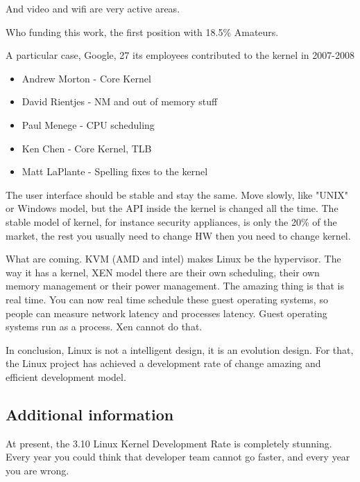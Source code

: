 \documentclass[11pt]{article}
\begin{document}
And video and wifi are very active areas.

Who funding this work, the first position with 18.5\% Amateurs.

A particular case, Google, 27 its employees contributed to the kernel in 2007-2008
\begin{itemize}
	\item Andrew Morton - Core Kernel
	\item David Rientjes - NM and out of memory stuff
	\item Paul Menege - CPU scheduling
	\item Ken Chen - Core Kernel, TLB
	\item Matt LaPlante - Spelling fixes to the kernel
\end{itemize}

The user interface should be stable and stay the same. Move slowly, like "UNIX" or Windows model, but the API inside the kernel is changed all the time. The stable model of kernel, for instance security appliances, is only the 20\% of the market, the rest you usually need to change HW then you need to change kernel.

What are coming.
KVM (AMD and intel) makes Linux be the hypervisor. The way it has a kernel, XEN model there are their own scheduling, their own memory management or their power management. The amazing thing is that is real time. You can now real time schedule these guest operating systems, so people can measure network latency and processes latency. Guest operating systems run as a process. Xen cannot do that.

In conclusion, Linux is not a intelligent design, it is an evolution design. For that, the Linux project has achieved a development rate of change amazing and efficient development model.

\subsection{Additional information}
At present, the 3.10 Linux Kernel Development Rate is completely stunning. Every year you could think that developer team cannot go faster, and every year you are wrong.
\end{document}
